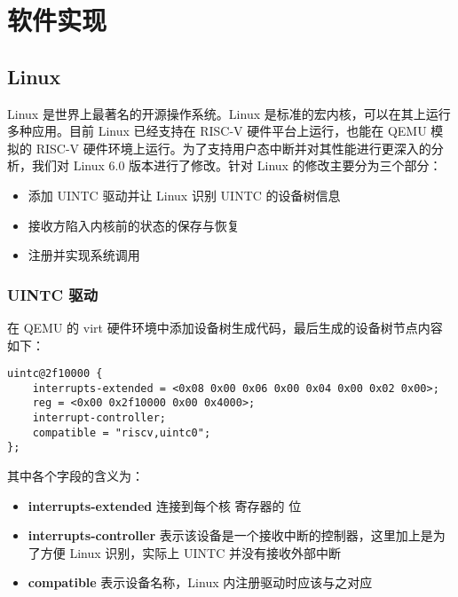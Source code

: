 
\chapter{软件实现}

\section{Linux}

Linux \cite{linux} 是世界上最著名的开源操作系统。Linux 是标准的宏内核，可以在其上运行多种应用。目前 Linux 已经支持在 RISC-V 硬件平台上运行，也能在 QEMU 模拟的 RISC-V 硬件环境上运行。为了支持用户态中断并对其性能进行更深入的分析，我们对 Linux 6.0 版本进行了修改。针对 Linux 的修改主要分为三个部分：

\begin{itemize}
    \item 添加 UINTC 驱动并让 Linux 识别 UINTC 的设备树信息
    \item 接收方陷入内核前的状态的保存与恢复
    \item 注册并实现系统调用
\end{itemize}

\subsection{UINTC 驱动}

在 QEMU 的 virt 硬件环境中添加设备树生成代码，最后生成的设备树节点内容如下：

\lstset{basicstyle=\footnotesize\tt}
\begin{lstlisting}
uintc@2f10000 {
    interrupts-extended = <0x08 0x00 0x06 0x00 0x04 0x00 0x02 0x00>;
    reg = <0x00 0x2f10000 0x00 0x4000>;
    interrupt-controller;
    compatible = "riscv,uintc0";
};
\end{lstlisting}

其中各个字段的含义为：

\begin{itemize}
    \item \textbf{interrupts-extended} 连接到每个核 \Ruip 寄存器的 \FcsrUipUsip 位
    \item \textbf{interrupts-controller} 表示该设备是一个接收中断的控制器，这里加上是为了方便 Linux 识别，实际上 UINTC 并没有接收外部中断
    \item \textbf{compatible} 表示设备名称，Linux 内注册驱动时应该与之对应
\end{itemize}

